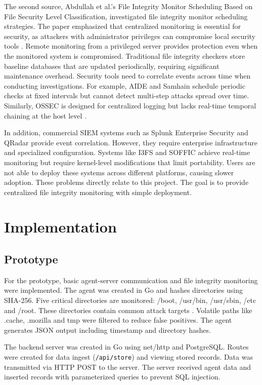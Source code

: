 \documentclass[conference]{IEEEtran}
\begin{document}
The second source, Abdullah et al.'s File Integrity Monitor Scheduling Based on File Security Level Classification, investigated file integrity monitor scheduling strategies. The paper emphasized that centralized monitoring is essential for security, as attackers with administrator privileges can compromise local security tools \cite{abdullah}. Remote monitoring from a privileged server provides protection even when the monitored system is compromised. Traditional file integrity checkers store baseline databases that are updated periodically, requiring significant maintenance overhead. Security tools need to correlate events across time when conducting investigations. For example, AIDE and Samhain schedule periodic checks at fixed intervals but cannot detect multi-step attacks spread over time. Similarly, OSSEC is designed for centralized logging but lacks real-time temporal chaining at the host level \cite{abdullah}.

In addition, commercial SIEM systems such as Splunk Enterprise Security and QRadar provide event correlation. However, they require enterprise infrastructure and specialized configuration. Systems like I3FS and SOFFIC achieve real-time monitoring but require kernel-level modifications that limit portability. Users are not able to deploy these systems across different platforms, causing slower adoption. These problems directly relate to this project. The goal is to provide centralized file integrity monitoring with simple deployment.

\section{Implementation}

\subsection{Prototype}

For the prototype, basic agent-server communication and file integrity monitoring were implemented. The agent was created in Go and hashes directories using SHA-256. Five critical directories are monitored: /boot, /usr/bin, /usr/sbin, /etc and /root. These directories contain common attack targets \cite{abdullah}. Volatile paths like .cache, .mozilla and tmp were filtered to reduce false positives. The agent generates JSON output including timestamp and directory hashes.

The backend server was created in Go using net/http and PostgreSQL. Routes were created for data ingest (\texttt{/api/store}) and viewing stored records. Data was transmitted via HTTP POST to the server. The server received agent data and inserted records with parameterized queries to prevent SQL injection.
\end{document}
